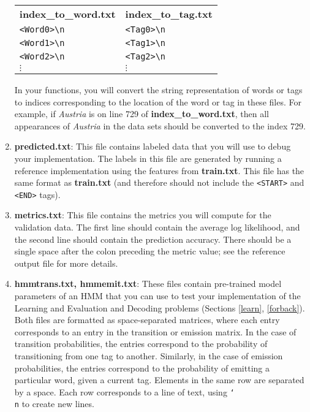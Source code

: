 \documentclass[11pt,addpoints,answers]{exam}
\begin{document}
\begin{enumerate}
\begin{tabular}{ m{5cm}  m{5cm} } 
    \textbf{index\_to\_word.txt} & \textbf{index\_to\_tag.txt} \\
    \texttt{<Word0>\textbackslash n} & \texttt{<Tag0>\textbackslash n} \\
    \texttt{<Word1>\textbackslash n} & \texttt{<Tag1>\textbackslash n} \\
    \texttt{<Word2>\textbackslash n} & \texttt{<Tag2>\textbackslash n} \\
    $\vdots$ & $\vdots$
\end{tabular}

In your functions, you will convert the string representation of words or tags to indices corresponding to the location of the word or tag in these files. For example, if \textit{Austria} is on line 729 of \textbf{index\_to\_word.txt}, then all appearances of \textit{Austria} in the data sets should be converted to the index 729.

\item \textbf{predicted.txt}: This file contains labeled data that you will use to debug your implementation. The labels in this file are generated by running a reference implementation using the features from \textbf{train.txt}. This file has the same format as \textbf{train.txt} (and therefore should not include the \texttt{<START>} and \texttt{<END>} tags).

\item \textbf{metrics.txt}: This file contains the metrics you will compute for the validation data. The first line should contain the average log likelihood, and the second line should contain the prediction accuracy. There should be a single space after the colon preceding the metric value; see the reference output file for more details.  

\item \textbf{hmmtrans.txt, hmmemit.txt}: These files contain pre-trained model parameters of an HMM that you can use to test your implementation of the Learning and Evaluation and Decoding problems (Sections \ref{learn}, \ref{forback}). Both files are formatted as space-separated matrices, where each entry corresponds to an entry in the transition or emission matrix. In the case of transition probabilities, the entries correspond to the probability of transitioning from one tag to another. Similarly, in the case of emission probabilities, the entries correspond to the probability of emitting a particular word, given a current tag. Elements in the same row are separated by a space. Each row corresponds to a line of text, using \texttt{\char`\\ n} to create new lines.
    

\end{enumerate}
\end{document}
